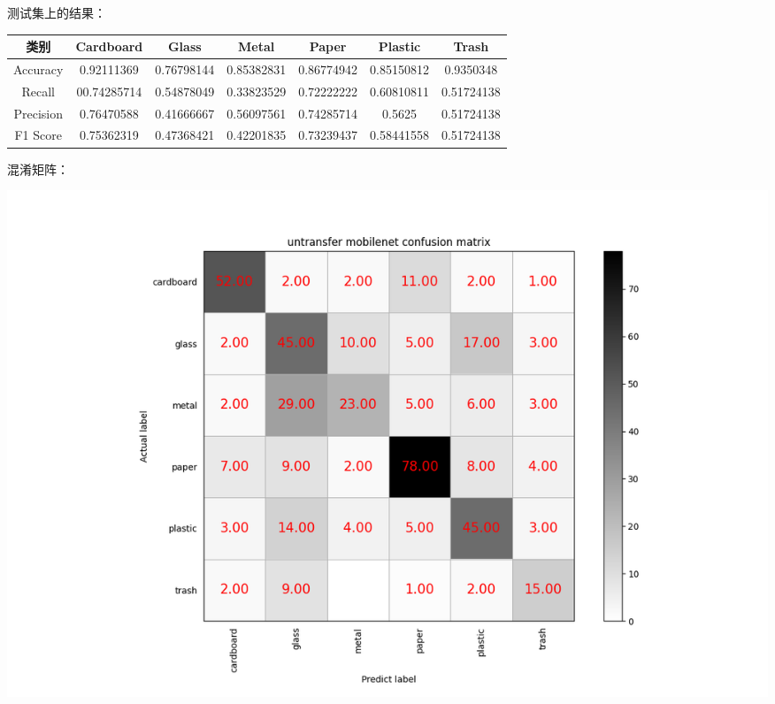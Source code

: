 \documentclass[UTF8]{ctexart}
\begin{document}
测试集上的结果：

\begin{tabular}{|c|c|c|c|c|c|c|}
\hline 
类别 & Cardboard & Glass & Metal & Paper & Plastic & Trash \\ 
\hline 
Accuracy &0.92111369& 0.76798144 &0.85382831& 0.86774942& 0.85150812& 0.9350348\\
 \hline 
Recall &00.74285714& 0.54878049& 0.33823529& 0.72222222 &0.60810811& 0.51724138\\ 
\hline 
Precision &0.76470588& 0.41666667& 0.56097561& 0.74285714 &0.5625    & 0.51724138\\ 
\hline 
F1 Score &0.75362319& 0.47368421 &0.42201835& 0.73239437 &0.58441558& 0.51724138\\ 
\hline 
\end{tabular}

混淆矩阵：

 \includegraphics[scale=0.5]{cm/untranmobile.png} 
\end{document}
